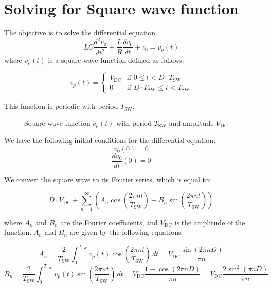 \documentclass{article}
\begin{document}
\section{Solving for Square wave function}

The objective is to solve the differential equation
\[ LC \frac{d^2 v_0}{dt^2} + \frac{L}{R} \frac{dv_0}{dt} + v_0 = v_p(t) \]
where \( v_p(t) \) is a square wave function defined as follows:

\[
v_p(t) =
\begin{cases}
V_{\text{DC}} & \text{if } 0 \leq t < D \cdot T_{\text{SW}} \\
0 & \text{if } D \cdot T_{\text{SW}} \leq t < T_{\text{SW}}
\end{cases}
\]

This function is periodic with period \( T_{\text{SW}} \).

\begin{figure}[h]
\centering
{}
\caption{Square wave function \( v_p(t) \) with period \( T_{\text{SW}} \) and amplitude \( V_{\text{DC}} \)}
\label{fig:square_wave}
\end{figure}

We have the following initial conditions for the differential equation:
\[ v_0(0) = 0 \]
\[ \frac{dv_0}{dt}(0) = 0 \]

We convert the square wave to its Fourier series, which is equal to:

\[
D \cdot V_{\text{DC}} + \sum_{n=1}^{\infty} \left( A_n \cos\left(\frac{2\pi n t}{T_{\text{SW}}}\right) + B_n \sin\left(\frac{2\pi n t}{T_{\text{SW}}}\right) \right)
\]

where \( A_n \) and \( B_n \) are the Fourier coefficients, and \( V_{\text{DC}} \) is the amplitude of the function.
\(A_n\) and \(B_n\) are given by the following equations:

\[A_n = \frac{2}{T_{\text{SW}}} \int_{0}^{T_{\text{SW}}} v_p(t) \cos\left(\frac{2\pi n t}{T_{\text{SW}}}\right) \, dt = V_{\text{DC}} \frac{\sin\left(2 \pi n D\right)}{\pi n}\]
\[B_n = \frac{2}{T_{\text{SW}}} \int_{0}^{T_{\text{SW}}} v_p(t) \sin\left(\frac{2\pi n t}{T_{\text{SW}}}\right) \, dt = V_{\text{DC}} \frac{1 - \cos\left(2 \pi n D\right)}{\pi n}= V_{\text{DC}} \frac{2 \sin^2\left(\pi n D\right)}{\pi n}\]
\end{document}
